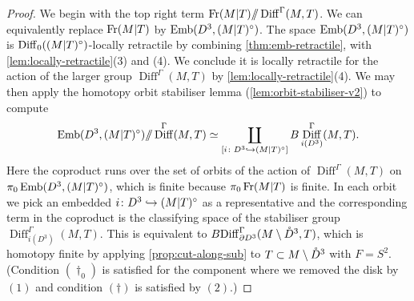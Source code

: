 \documentclass{amsart}
\theoremstyle{plain}
\theoremstyle{definition}
\DeclareMathOperator\Diff{Diff}
\DeclareMathOperator\emb{Emb}
\DeclareMathOperator\Fr{Fr}
\newcommand{\interior}[1]{\smash{\mathring{#1}}}
\newcommand{\ca}{\smash{\mid}} %
\newcommand{\hq}{/\!\!/} %
\newcommand{\BDiff}{B\!\Diff}
\begin{document}
\begin{proof}
    We begin with the top right term $\Fr(M \ca T) \hq \Diff^\Gamma(M, T)$.
    We can equivalently replace $\Fr(M \ca T)$ by $\emb(D^3, (M \ca T)^\circ)$.
    The space $\emb(D^3, (M\ca T)^\circ)$ is $\Diff_0((M \ca T)^\circ)$-locally retractile by combining \cref{thm:emb-retractile}, with \cref{lem:locally-retractile}(3) and (4). We conclude it is locally retractile for the action of the larger group $\Diff^\Gamma(M, T)$ by \cref{lem:locally-retractile}(4).
    We may then apply the homotopy orbit stabiliser lemma (\cref{lem:orbit-stabiliser-v2}) to compute
    \[
        \emb(D^3,(M \ca T)^\circ)\hq \Diff^\Gamma(M, T) 
        \simeq \coprod_{[i\colon D^3 \hookrightarrow (M \ca T)^\circ]} B\Diff_{i(D^3)}^\Gamma(M, T).
    \]
    Here the coproduct runs over the set of orbits of the action of $\Diff^\Gamma(M, T)$ on $\pi_0\emb(D^3, (M \ca T)^\circ)$, which is finite because $\pi_0\Fr(M \ca T)$ is finite.
    In each orbit we pick an embedded $i\colon D^3 \hookrightarrow (M \ca T)^\circ$ as a representative and the corresponding term in the coproduct is the classifying space of the stabiliser group  $\Diff_{i(D^3)}^\Gamma(M, T)$.
    This is equivalent to $\BDiff_{\partial D^3}^\Gamma(M \setminus \interior{D}^3, T)$, which is homotopy finite by applying \cref{prop:cut-along-sub} to $T \subset M \setminus \interior{D}^3$ with $F=S^2$.
    (Condition $(\dagger_0)$ is satisfied for the component where we removed the disk by $(1)$ and condition $(\dagger)$ is satisfied by $(2)$.) 
    


\end{proof}
\end{document}
